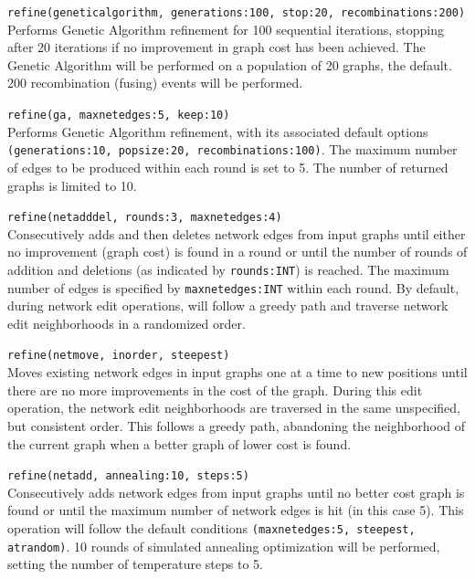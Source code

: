 	\begin{example}
	
		\item{\texttt{refine(geneticalgorithm, generations:100, stop:20, recombinations:200)}\\ 
		Performs Genetic Algorithm refinement for 100 sequential iterations, stopping after 
		20 iterations if no improvement in graph cost has been achieved. The Genetic 
		Algorithm will be performed on a population of 20 graphs, 	the default. 200
		recombination (fusing) events will be performed.}\\
		   
		\item{\texttt{refine(ga, maxnetedges:5, keep:10)} \\Performs Genetic Algorithm 
		refinement, with its associated default options \texttt{(generations:10, popsize:20, 
		recombinations:100)}. The maximum number of edges to be produced within
		each round is set to 5. The number of returned graphs is limited to 10.}\\
		   
		\item{\texttt{refine(netadddel, rounds:3, maxnetedges:4)}\\ Consecutively adds 
		and then deletes network edges from input graphs until either no improvement 
		(graph cost) is found in a round or until the number of rounds of addition and 
		deletions (as indicated by \texttt{rounds:INT}) is reached. The maximum number 
		of edges is specified by \texttt{maxnetedges:INT} within each round. By default,  
		during network edit operations, \phyg will follow a greedy path and traverse 
		network edit neighborhoods in a randomized order.}
		
		\item{\texttt{refine(netmove, inorder, steepest)} \\ Moves existing network 
		edges in input graphs one at a time to new positions until there are no more 
		improvements in the cost of the graph. During this edit operation, the network 
		edit neighborhoods are traversed in the same unspecified, but consistent order.
		This follows a greedy path, abandoning the neighborhood of the current 
		graph when a better graph of lower cost is found.}
		
		\item{\texttt{refine(netadd, annealing:10, steps:5)} \\ 
		Consecutively adds network edges from input graphs until no better cost
		graph is found or until the maximum number of network edges is hit (in
		this case 5). This operation will follow the default conditions 
		\texttt{(maxnetedges:5, steepest, atrandom)}. 10 rounds of simulated 
		annealing optimization will be performed, setting the number of temperature 
		steps to 5.}
		

\end{example}
